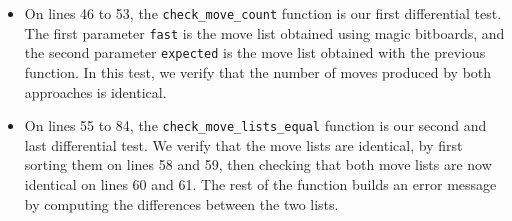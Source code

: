 \documentclass[12pt,a4paper,twoside,openright]{book}
\begin{document}
\begin{itemize}
The loops on lines 23 and 24 iterate over all possible directions for the piece, taking care to filter out the null displacement on line 25. Finally, the loop from line 28 to 37 moves in the chosen direction \texttt{(di, dj)} as long as we do not leave the board and there are no obstacles. If we leave the board on line 29, or an obstacle is detected on line 33, we break out of the loop to try a new direction. We do not forget on line 42 to add \texttt{Move::none()} if no move was possible. This way of building all possible moves is very intuitive (but inefficient).

\item On lines 46 to 53, the \texttt{check_move_count} function is our first differential test. The first parameter \texttt{fast} is the move list obtained using magic bitboards, and the second parameter \texttt{expected} is the move list obtained with the previous function. In this test, we verify that the number of moves produced by both approaches is identical.

\item On lines 55 to 84, the \texttt{check_move_lists_equal} function is our second and last differential test. We verify that the move lists are identical, by first sorting them on lines 58 and 59, then checking that both move lists are now identical on lines 60 and 61. The rest of the function builds an error message by computing the differences between the two lists.


\end{itemize}
\end{document}

